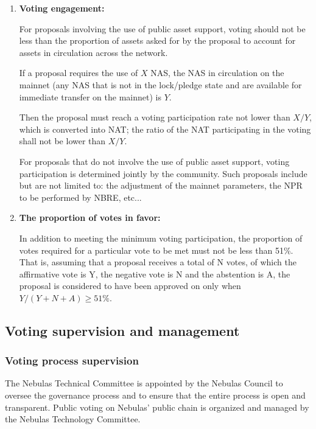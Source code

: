 \begin{enumerate}
	\item

	\textbf{Voting engagement:}

	For proposals involving the use of public asset support, voting should not be less than the proportion of assets asked for by the proposal to account for assets in circulation across the network.

	If a proposal requires the use of $X$ NAS, the NAS in circulation on the
	  mainnet (any NAS that is not in the lock/pledge state and are available for
	  immediate transfer on the mainnet) is $Y$.

	Then the proposal must reach a voting participation rate not lower than
	  $X/Y$, which is converted into NAT; the ratio of the NAT participating in
	  the voting shall not be lower than $X/Y$.

	For proposals that do not involve the use of public asset support, voting participation is determined jointly by the community. Such proposals include but are not limited to: the adjustment of the mainnet parameters, the NPR to be performed by NBRE, etc...

	\item

	\textbf{The proportion of votes in favor:}

	In addition to meeting the minimum voting participation, the proportion of
	  votes required for a particular vote to be met must not be less than 51\%.
	  That is, assuming that a proposal receives a total of N votes, of which the
	  affirmative vote is Y, the negative vote is N and the abstention is A, the
	  proposal is considered to have been approved on only when $Y/(Y+N+A) \ge
	  51\%$.

\end{enumerate}

\subsection{Voting supervision and management}

\subsubsection{Voting process supervision}
\label{second-vote}

The Nebulas Technical Committee is appointed by the Nebulas Council to oversee the governance process and to ensure that the entire process is open and transparent. Public voting on Nebulas' public chain is organized and managed by the Nebulas Technology Committee.

